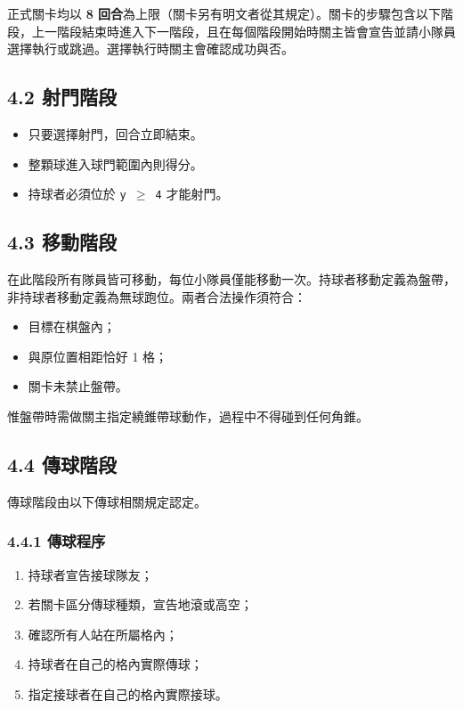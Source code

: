 \documentclass[11pt]{article}
\newcommand{\term}[1]{\textbf{#1}}
\newcommand{\coord}[1]{\texttt{#1}}
\begin{document}
正式關卡均以 \term{8 回合}為上限（關卡另有明文者從其規定）。關卡的步驟包含以下階段，上一階段結束時進入下一階段，且在每個階段開始時關主皆會宣告並請小隊員選擇執行或跳過。選擇執行時關主會確認成功與否。

\subsection*{4.2 射門階段}

\begin{itemize}
  \item 只要選擇射門，回合立即結束。
  \item 整顆球進入球門範圍內則得分。
  \item 持球者必須位於 \coord{y $\geq$ 4} 才能射門。
\end{itemize}

\subsection*{4.3 移動階段}

在此階段所有隊員皆可移動，每位小隊員僅能移動一次。持球者移動定義為盤帶，非持球者移動定義為無球跑位。兩者合法操作須符合：

\begin{itemize}
  \item 目標在棋盤內；
  \item 與原位置相距恰好 1 格；
  \item 關卡未禁止盤帶。
\end{itemize}

惟盤帶時需做關主指定繞錐帶球動作，過程中不得碰到任何角錐。

\subsection*{4.4 傳球階段}

傳球階段由以下傳球相關規定認定。

\subsubsection*{4.4.1 傳球程序}

\begin{enumerate}
  \item 持球者宣告接球隊友；
  \item 若關卡區分傳球種類，宣告地滾或高空；
  \item 確認所有人站在所屬格內；
  \item 持球者在自己的格內實際傳球；
  \item 指定接球者在自己的格內實際接球。
\end{enumerate}
\end{document}
